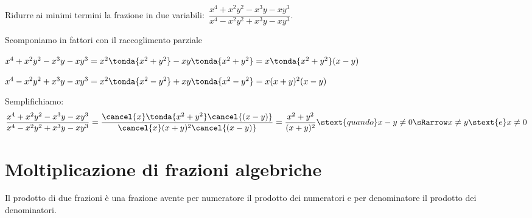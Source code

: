  \begin{esempio}
Ridurre ai minimi termini la frazione in due 
variabili:~\(\dfrac{x^{4}+x^{2}y^{2}-x^{3}y-xy^{3}}
                   {x^{4}-x^{2}y^{2}+x^{3}y-xy^{3}}\).
\begin{itemize*}
 \item Scomponiamo in fattori con il raccoglimento parziale
  \begin{itemize*}
  \item \(x^{4}+x^{2}y^{2}-x^{3}y-xy^{3}=
   x^{2}  \tonda{x^{2}+y^{2}} -xy  \tonda{x^{2}+y^{2}} =
   x  \tonda{x^{2}+y^{2}}  (x-y)\)
  \item \(x^{4}-x^{2}y^{2}+x^{3}y-xy^{3}=
   x^{2}  \tonda{x^{2}-y^{2}} +xy  \tonda{x^{2}-y^{2}} =
   x (x+y)^{2} (x-y)\)
  \end{itemize*}
 \item Semplifichiamo:
\[\dfrac{x^{4}+x^{2}y^{2}-x^{3}y-xy^{3}}
        {x^{4}-x^{2}y^{2}+x^{3}y-xy^{3}}=
  \dfrac{\cancel{x}  \tonda{x^{2}+y^{2}}  \cancel{(x-y)}}
        {\cancel{x}(x+y)^{2} \cancel{(x-y)}}=\dfrac{x^2+y^2}{(x+y)^2} 
  \stext{quando} x-y \neq 0 \sRarrow x \neq y \stext{e} x \neq 0\]
\end{itemize*}
 \end{esempio}



\section{Moltiplicazione di frazioni algebriche}
\label{sec:frazalg_moltiplicazione}

Il prodotto di due frazioni è una frazione avente per numeratore il prodotto 
dei numeratori e per denominatore il prodotto dei denominatori.


